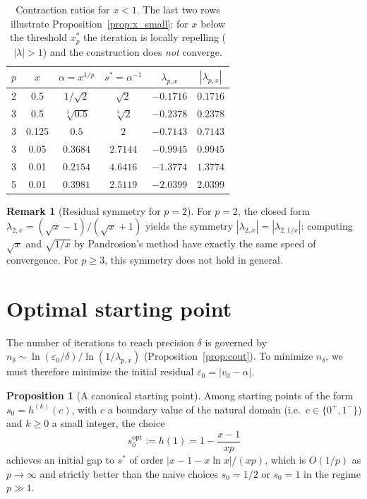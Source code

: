 \documentclass[11pt,a4paper]{article}
\theoremstyle{definition}
\newtheorem{proposition}{Proposition}[section]
\newtheorem{remark}{Remark}[section]
\newcommand{\cbrt}[1]{\sqrt[3]{#1}}
\newcommand{\eps}{\varepsilon}
\begin{document}
\begin{table}[h]
\centering
\begin{tabular}{cccccc}
\toprule
$p$ & $x$ & $\alpha = x^{1/p}$ & $s^* = \alpha^{-1}$ & $\lambda_{p,x}$ & $|\lambda_{p,x}|$ \\
\midrule
2 & 0.5   & $1/\sqrt{2}$   & $\sqrt{2}$    & $-0.1716$ & $0.1716$ \\
3 & 0.5   & $\cbrt{0.5}$   & $\cbrt{2}$    & $-0.2378$ & $0.2378$ \\
3 & 0.125 & $0.5$          & $2$           & $-0.7143$ & $0.7143$ \\
3 & 0.05  & $0.3684$       & $2.7144$      & $-0.9945$ & $0.9945$ \\
\midrule
3 & 0.01  & $0.2154$       & $4.6416$      & $-1.3774$ & $\mathbf{1.3774}$ \\
5 & 0.01  & $0.3981$       & $2.5119$      & $-2.0399$ & $\mathbf{2.0399}$ \\
\bottomrule
\end{tabular}
\caption{Contraction ratios for $x < 1$. The last two rows illustrate Proposition~\ref{prop:x_small}: for $x$ below the threshold $x^\ast_p$ the iteration is locally repelling ($|\lambda| > 1$) and the construction does \emph{not} converge.}
\end{table}

\begin{remark}[Residual symmetry for $p=2$]
For $p = 2$, the closed form $\lambda_{2,x} = (\sqrt{x}-1)/(\sqrt{x}+1)$ yields the symmetry $|\lambda_{2,x}| = |\lambda_{2,1/x}|$: computing $\sqrt{x}$ and $\sqrt{1/x}$ by Pandrosion's method have exactly the same speed of convergence. For $p \geq 3$, this symmetry does not hold in general.
\end{remark}

\section{Optimal starting point}
\label{sec:optimal_start}

The number of iterations to reach precision $\delta$ is governed by $n_\delta \sim \ln(\eps_0/\delta) / \ln(1/\lambda_{p,x})$ (Proposition~\ref{prop:cout}). To minimize $n_\delta$, we must therefore minimize the initial residual $\eps_0 = |v_0 - \alpha|$.

\begin{proposition}[A canonical starting point]
\label{prop:optimal_start}
Among starting points of the form $s_0 = h^{(k)}(c)$, with $c$ a boundary value of the natural domain (i.e.\ $c \in \{0^+, 1^-\}$) and $k \geq 0$ a small integer, the choice
\begin{equation}
  \label{eq:optimal_s0}
  s_0^{\mathrm{opt}} := h(1) = 1 - \frac{x-1}{xp}
\end{equation}
achieves an initial gap to $s^*$ of order $|x - 1 - x\ln x|/(xp)$, which is $O(1/p)$ as $p \to \infty$ and strictly better than the naive choices $s_0 = 1/2$ or $s_0 = 1$ in the regime $p \gg 1$.
\end{proposition}
\end{document}
